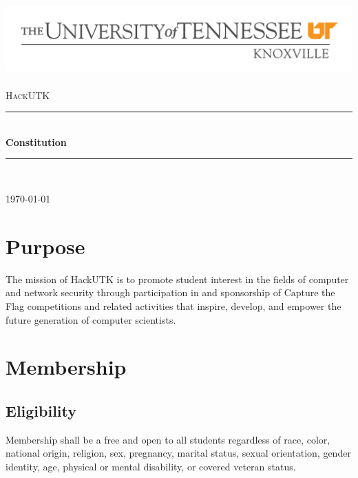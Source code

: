 \documentclass[12pt]{article}
\newcommand{\HRule}{\rule{\linewidth}{0.5mm}}
\begin{document}
\begin{titlepage}
\begin{center}

\includegraphics[width=1\textwidth]{utlogo2-large.png}~\\[1cm]


\textsc{\Large HackUTK}\\[0.5cm]

\HRule \\[0.4cm]
{ \huge \bfseries Constitution \\[0.4cm] }

\HRule \\[1.5cm]


\vfill

{\large \today}

\end{center}
\end{titlepage}

\section*{Purpose}
The mission of HackUTK is to promote student interest in the fields of computer and network security through participation in and sponsorship of Capture the Flag competitions and related activities that inspire, develop, and empower the future generation of computer scientists.

\section*{Membership}
\subsection{Eligibility}
Membership shall be a free and open to all students regardless of race, color, national origin, religion, sex, pregnancy, marital status, sexual orientation, gender identity, age, physical or mental disability, or covered veteran status.
\end{document}
